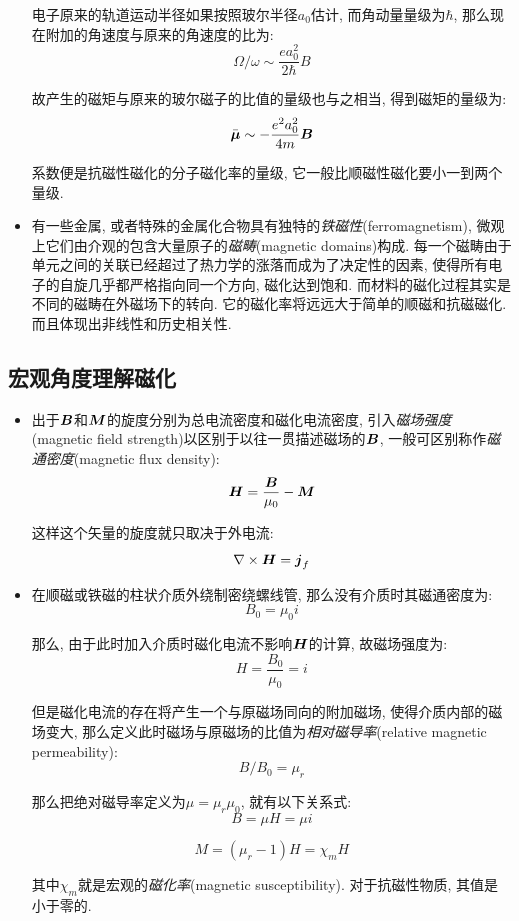 \begin{itemize}
电子原来的轨道运动半径如果按照玻尔半径$a_0$估计, 而角动量量级为$\hbar$, 那么现在附加的角速度与原来的角速度的比为:
\[\Omega/\omega\sim\frac{ea_0^2}{2\hbar}B\]

故产生的磁矩与原来的玻尔磁子的比值的量级也与之相当, 得到磁矩的量级为:
\[\bar{\boldsymbol{\mu}}\sim-\frac{e^2a_0^2	}{4m}\boldsymbol{B}\]

系数便是抗磁性磁化的分子磁化率的量级, 它一般比顺磁性磁化要小一到两个量级.

\item 有一些金属, 或者特殊的金属化合物具有独特的\emph{铁磁性}(ferromagnetism), 微观上它们由介观的包含大量原子的\emph{磁畴}(magnetic domains)构成. 每一个磁畴由于单元之间的关联已经超过了热力学的涨落而成为了决定性的因素, 使得所有电子的自旋几乎都严格指向同一个方向, 磁化达到饱和. 而材料的磁化过程其实是不同的磁畴在外磁场下的转向. 它的磁化率将远远大于简单的顺磁和抗磁磁化. 而且体现出非线性和历史相关性.


\end{itemize}

\subsection{宏观角度理解磁化}

\begin{itemize}
\item 出于$\boldsymbol{B}$和$\boldsymbol{M}$的旋度分别为总电流密度和磁化电流密度, 引入\emph{磁场强度}(magnetic field strength)以区别于以往一贯描述磁场的$\boldsymbol{B}$, 一般可区别称作\emph{磁通密度}(magnetic flux density):
\[\boldsymbol{H}=\frac{\boldsymbol{B}}{\mu_0}-\boldsymbol{M}\]

这样这个矢量的旋度就只取决于外电流:
\[\nabla\times \boldsymbol{H}=\boldsymbol{j}_f\]

\item 在顺磁或铁磁的柱状介质外绕制密绕螺线管, 那么没有介质时其磁通密度为:
\[B_0=\mu_0 i\]

那么, 由于此时加入介质时磁化电流不影响$\boldsymbol{H}$的计算, 故磁场强度为:
\[H=\frac{B_0}{\mu_0}=i\]

但是磁化电流的存在将产生一个与原磁场同向的附加磁场, 使得介质内部的磁场变大, 那么定义此时磁场与原磁场的比值为\emph{相对磁导率}(relative magnetic permeability):
\[B/B_0=\mu_r\]

那么把绝对磁导率定义为$\mu=\mu_r\mu_0$, 就有以下关系式:
\[B=\mu H=\mu i\]

\[M=(\mu_r-1)H=\chi_m H\]

其中$\chi_m$就是宏观的\emph{磁化率}(magnetic susceptibility). 对于抗磁性物质, 其值是小于零的.


\end{itemize}

